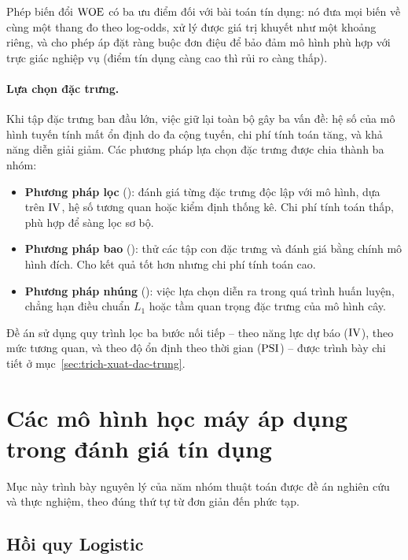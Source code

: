 Phép biến đổi $\mathrm{WOE}$ có ba ưu điểm đối với bài toán tín dụng: nó đưa mọi biến về
cùng một thang đo theo log-odds, xử lý được giá trị khuyết như một khoảng riêng,
và cho phép áp đặt ràng buộc đơn điệu để bảo đảm mô hình phù hợp với trực giác
nghiệp vụ (điểm tín dụng càng cao thì rủi ro càng thấp).

\paragraph{Lựa chọn đặc trưng.} Khi tập đặc trưng ban đầu lớn, việc giữ lại toàn
bộ gây ba vấn đề: hệ số của mô hình tuyến tính mất ổn định do đa cộng tuyến, chi
phí tính toán tăng, và khả năng diễn giải giảm. Các phương pháp lựa chọn đặc
trưng được chia thành ba nhóm:

\begin{itemize}
  \item \textbf{Phương pháp lọc} (): đánh giá từng đặc trưng độc lập
  với mô hình, dựa trên $\mathrm{IV}$, hệ số tương quan hoặc kiểm định thống kê. Chi phí
  tính toán thấp, phù hợp để sàng lọc sơ bộ.

  \item \textbf{Phương pháp bao} (): thử các tập con đặc trưng và
  đánh giá bằng chính mô hình đích. Cho kết quả tốt hơn nhưng chi phí tính toán
  cao.

  \item \textbf{Phương pháp nhúng} (): việc lựa chọn diễn ra trong
  quá trình huấn luyện, chẳng hạn điều chuẩn $L_1$ hoặc tầm quan trọng đặc trưng
  của mô hình cây.
\end{itemize}

Đề án sử dụng quy trình lọc ba bước nối tiếp -- theo năng lực dự báo ($\mathrm{IV}$),
theo mức tương quan, và theo độ ổn định theo thời gian ($\mathrm{PSI}$) -- được trình bày
chi tiết ở mục~\ref{sec:trich-xuat-dac-trung}.

\section{Các mô hình học máy áp dụng trong đánh giá tín dụng}
\label{sec:cac-mo-hinh}

Mục này trình bày nguyên lý của năm nhóm thuật toán được đề án nghiên cứu và thực
nghiệm, theo đúng thứ tự từ đơn giản đến phức tạp.

\subsection{Hồi quy Logistic}
\label{subsec:hoi-quy-logistic}

